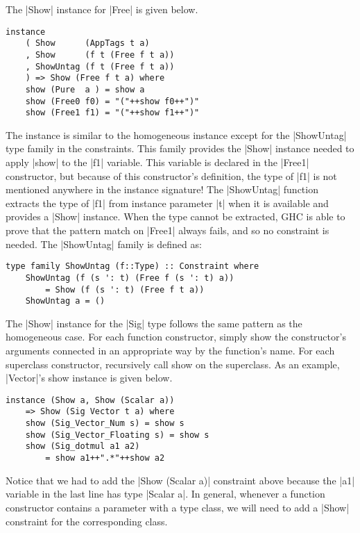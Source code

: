 \documentclass[preprint]{sigplanconf}
\theoremstyle{definition}
\begin{document}
The |Show| instance for |Free| is given below.
\begin{lstlisting}
instance
    ( Show      (AppTags t a)
    , Show      (f t (Free f t a))
    , ShowUntag (f t (Free f t a))
    ) => Show (Free f t a) where
    show (Pure  a ) = show a
    show (Free0 f0) = "("++show f0++")"
    show (Free1 f1) = "("++show f1++")"
\end{lstlisting}
The instance is similar to the homogeneous instance except for the |ShowUntag| type family in the constraints.
This family provides the |Show| instance needed to apply |show| to the |f1| variable.
This variable is declared in the |Free1| constructor,
but because of this constructor's definition,
the type of |f1| is not mentioned anywhere in the instance signature!
The |ShowUntag| function extracts the type of |f1| from instance parameter |t| when it is available and provides a |Show| instance.
When the type cannot be extracted, GHC is able to prove that the pattern match on |Free1| always fails, and so no constraint is needed.
The |ShowUntag| family is defined as:

\newpage
\begin{lstlisting}
type family ShowUntag (f::Type) :: Constraint where
    ShowUntag (f (s ': t) (Free f (s ': t) a))
        = Show (f (s ': t) (Free f t a))
    ShowUntag a = ()
\end{lstlisting}

The |Show| instance for the |Sig| type follows the same pattern as the homogeneous case.
For each function constructor,
simply show the constructor's arguments connected in an appropriate way by the function's name.
For each superclass constructor, recursively call show on the superclass.
As an example, |Vector|'s show instance is given below.
\begin{lstlisting}
instance (Show a, Show (Scalar a))
    => Show (Sig Vector t a) where
    show (Sig_Vector_Num s) = show s
    show (Sig_Vector_Floating s) = show s
    show (Sig_dotmul a1 a2)
        = show a1++".*"++show a2
\end{lstlisting}
Notice that we had to add the |Show (Scalar a)| constraint above because the |a1| variable in the last line has type |Scalar a|.
In general, whenever a function constructor contains a parameter with a type class,
we will need to add a |Show| constraint for the corresponding class.
\end{document}

